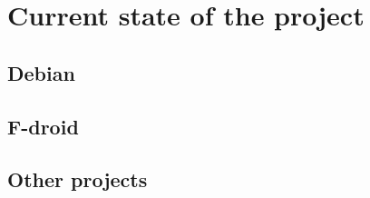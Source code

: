 \section{Current state of the project}

\subsection[Debian]{Debian}
\nopagebreak[4]{
}
\subsection[F-droid]{F-droid}
\nopagebreak[4]{
}
\subsection[Other projects]{Other projects}
\nopagebreak[4]{
}


